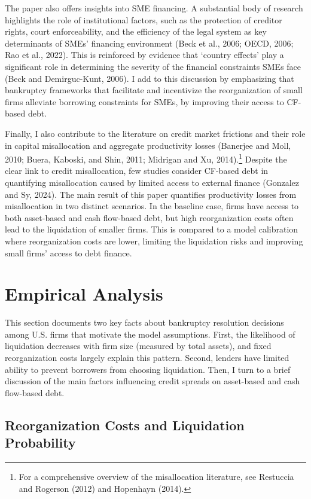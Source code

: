 \documentclass[12pt]{article}
\begin{document}
The paper also offers insights into SME financing. A substantial body of research highlights the role of institutional factors, such as the protection of creditor rights, court enforceability, and the efficiency of the legal system as key determinants of SMEs' financing environment (Beck et al., 2006; OECD, 2006; Rao et al., 2022). This is reinforced by evidence that `country effects' play a significant role in determining the severity of the financial constraints SMEs face (Beck and Demirguc-Kunt, 2006). I add to this discussion by emphasizing that bankruptcy frameworks that facilitate and incentivize the reorganization of small firms alleviate borrowing constraints for SMEs, by improving their access to CF-based debt. 

Finally, I also contribute to the literature on credit market frictions and their role in capital misallocation and aggregate productivity losses (Banerjee and Moll, 2010; Buera, Kaboski, and Shin, 2011; Midrigan and Xu, 2014).\footnote{For a comprehensive overview of the misallocation literature, see Restuccia and Rogerson (2012) and Hopenhayn (2014).} Despite the clear link to credit misallocation, few studies consider CF-based debt in quantifying misallocation caused by limited access to external finance (Gonzalez and Sy, 2024). The main result of this paper quantifies productivity losses from misallocation in two distinct scenarios. In the baseline case, firms have access to both asset-based and cash flow-based debt, but high reorganization costs often lead to the liquidation of smaller firms. This is compared to a model calibration where reorganization costs are lower, limiting the liquidation risks and improving small firms' access to debt finance. 

\section{Empirical Analysis \label{sec:empirical analysis}}

This section documents two key facts about bankruptcy resolution decisions among U.S. firms that motivate the model assumptions. First, the likelihood of liquidation decreases with firm size (measured by total assets), and fixed reorganization costs largely explain this pattern. Second, lenders have limited ability to prevent borrowers from choosing liquidation. Then, I turn to a brief discussion of the main factors influencing credit spreads on asset-based and cash flow-based debt.

\subsection{Reorganization Costs and Liquidation Probability \label{sec:emp liqprob}} 
\end{document}
